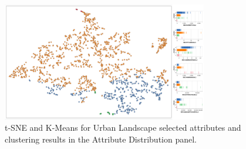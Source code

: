 \begin{figure}[ht]
 \centering
 \includegraphics[width=0.8\textwidth]{salurbal-case-study-5.png}
 \caption{t-SNE and K-Means for Urban Landscape selected attributes and clustering results in the Attribute Distribution panel.}
 \label{fig:salurbal-case-study-5}
\end{figure}